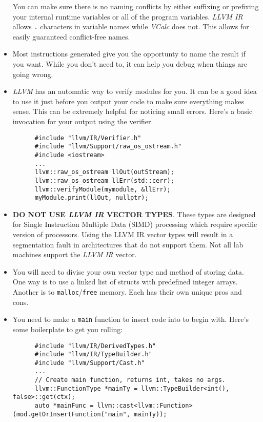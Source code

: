 \documentclass{article}
\newcommand{\code}[1]{\texttt{\textmd{#1}}}
\begin{document}
\begin{itemize}
    You can make sure there is no naming conflicts by either suffixing or prefixing your internal
    runtime variables or all of the program variables. \textit{LLVM IR} allows \code{.} characters
    in variable names while \textit{VCalc} does not. This allows for easily guaranteed conflict-free
    names.
  \item
    Most instructions generated give you the opportunty to name the result if you want. While you
    don't need to, it can help you debug when things are going wrong.
  \item
    \textit{LLVM} has an automatic way to verify modules for you. It can be a good idea to use it
    just before you output your code to make sure everything makes sense. This can be extremely
    helpful for noticing small errors. Here's a basic invocation for your output using the verifier.
    \begin{lstlisting}
      #include "llvm/IR/Verifier.h"
      #include "llvm/Support/raw_os_ostream.h"
      #include <iostream>
      ...
      llvm::raw_os_ostream llOut(outStream);
      llvm::raw_os_ostream llErr(std::cerr);
      llvm::verifyModule(mymodule, &llErr);
      myModule.print(llOut, nullptr);
    \end{lstlisting}
  \item
    \textbf{DO NOT USE \textit{LLVM IR} VECTOR TYPES}. These types are designed for Single
    Instruction Multiple Data (SIMD) processing which require specific version of processors. Using
    the LLVM IR vector types will result in a segmentation fault in architectures that do not
    support them. Not all lab machines support the \textit{LLVM IR} vector.
  \item
    You will need to divise your own vector type and method of storing data. One way is to use a
    linked list of structs with predefined integer arrays. Another is to \code{malloc}/\code{free}
    memory. Each has their own unique pros and cons.
  \item
    You need to make a \code{main} function to insert code into to begin with. Here's some
    boilerplate to get you rolling:
    \begin{lstlisting}
      #include "llvm/IR/DerivedTypes.h"
      #include "llvm/IR/TypeBuilder.h"
      #include "llvm/Support/Cast.h"
      ...
      // Create main function, returns int, takes no args.
      llvm::FunctionType *mainTy = llvm::TypeBuilder<int(), false>::get(ctx);
      auto *mainFunc = llvm::cast<llvm::Function>(mod.getOrInsertFunction("main", mainTy));


\end{lstlisting}
\end{itemize}
\end{document}
